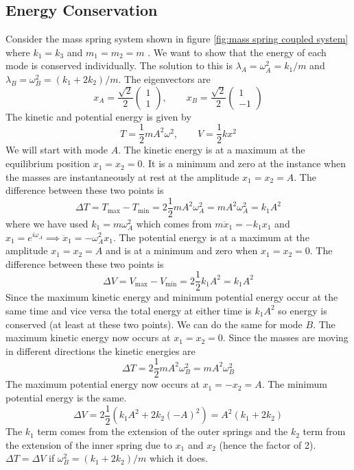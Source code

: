 \documentclass{article}
\begin{document}
    \subsection{Energy Conservation}
    Consider the mass spring system shown in figure \ref{fig:mass spring coupled system} where \(k_1 = k_3\) and \(m_1 = m_2 = m\) .
    We want to show that the energy of each mode is conserved individually.
    The solution to this is \(\lambda_A = \omega_A^2 = k_1/m\) and \(\lambda_B = \omega_B^2 = (k_1 + 2k_2)/m\).
    The eigenvectors are
    \[
        x_A = \frac{\sqrt{2}}{2}
        \begin{pmatrix}
            1 \\ 1
        \end{pmatrix}
        ,\qquad
        x_B = \frac{\sqrt{2}}{2}
        \begin{pmatrix}
            1 \\ -1
        \end{pmatrix}
    \]
    The kinetic and potential energy is given by
    \[T = \frac{1}{2}mA^2\omega^2,\qquad V = \frac{1}{2}kx^2\]
    We will start with mode \(A\).
    The kinetic energy is at a maximum at the equilibrium position \(x_1 = x_2 = 0\).
    It is a minimum and zero at the instance when the masses are instantaneously at rest at the amplitude \(x_1 = x_2 = A\).
    The difference between these two points is
    \[\Delta T = T_\text{max} - T_\text{min} = 2\frac{1}{2}mA^2\omega_A^2 = mA^2\omega_A^2 = k_1A^2\]
    where we have used \(k_1 = m\omega_A^2\) which comes from \(m\ddot x_1 = -k_1 x_1\) and \(x_1 = e^{i\omega_A} \implies \ddot x_1 = -\omega_A^2x_1\).
    The potential energy is at a maximum at the amplitude \(x_1 = x_2 = A\) and is at a minimum and zero when \(x_1 = x_2 = 0\).
    The difference between these two points is
    \[\Delta V = V_\text{max} - V_\text{min} = 2\frac{1}{2}k_1A^2 = k_1A^2\]
    Since the maximum kinetic energy and minimum potential energy occur at the same time and vice versa the total energy at either time is \(k_1A^2\) so energy is conserved (at least at these two points).
    We can do the same for mode \(B\).
    The maximum kinetic energy now occurs at \(x_1 = x_2 = 0\).
    Since the masses are moving in different directions the kinetic energies are
    \[\Delta T = 2\frac{1}{2}mA^2\omega_B^2 = mA^2\omega_B^2\]
    The maximum potential energy now occurs at \(x_1 = -x_2 = A\).
    The minimum potential energy is the same.
    \[\Delta V = 2\frac{1}{2}(k_1A^2 + 2k_2(-A)^2) = A^2(k_1 + 2k_2)\]
    The \(k_1\) term comes from the extension of the outer springs and the \(k_2\) term from the extension of the inner spring due to \(x_1\) and \(x_2\) (hence the factor of 2).
    \(\Delta T = \Delta V\) if \(\omega_B^2 = (k_1 + 2k_2)/m\) which it does.
    
\end{document}
